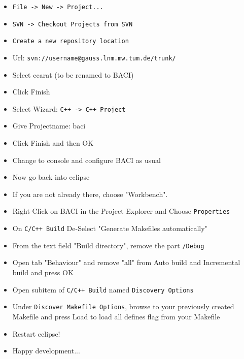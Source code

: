 \begin{itemize}
\item \texttt{File -> New -> Project...}
\item  \texttt{SVN -> Checkout Projects from SVN}
\item  \texttt{Create a new repository location}
\item  Url: \texttt{svn://username@gauss.lnm.mw.tum.de/trunk/}

\item Select ccarat (to be renamed to BACI)

\item Click Finish

\item Select Wizard: \texttt{C++ -> C++ Project}

\item Give Projectname: baci

\item Click Finish and then OK

\item Change to console and configure BACI as usual

\item Now go back into eclipse

\item If you are not already there, choose "Workbench".

\item Right-Click on BACI in the Project Explorer and Choose \texttt{Properties}

\item On \texttt{C/C++ Build} De-Select "Generate Makefiles automatically"

\item From the text field "Build directory", remove the part \texttt{/Debug}

\item Open tab "Behaviour" and remove "all" from Auto build and Incremental build and press OK

\item Open subitem of \texttt{C/C++ Build} named \texttt{Discovery Options}

\item Under \texttt{Discover Makefile Options}, browse to your previously created Makefile and press Load to load all defines flag from your Makefile

\item Restart eclipse!

\item Happy development...

\end{itemize}

